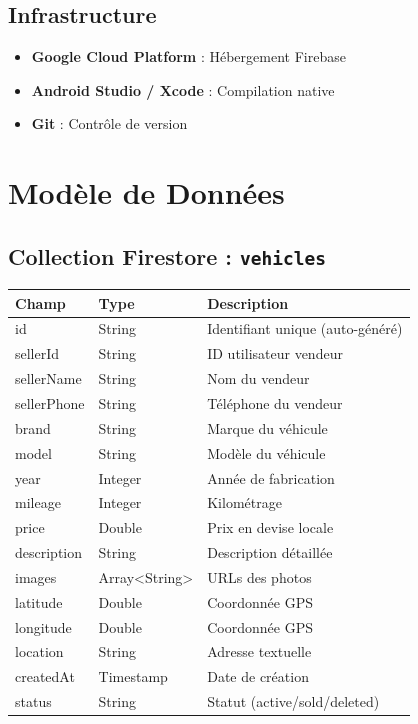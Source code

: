 \documentclass[11pt,a4paper]{article}
\begin{document}
\subsection{Infrastructure}

\begin{itemize}
    \item \textbf{Google Cloud Platform} : Hébergement Firebase
    \item \textbf{Android Studio / Xcode} : Compilation native
    \item \textbf{Git} : Contrôle de version
\end{itemize}

\section{Modèle de Données}

\subsection{Collection Firestore : \texttt{vehicles}}

\begin{small}
\begin{tabular}{|l|l|p{6cm}|}
\hline
\textbf{Champ} & \textbf{Type} & \textbf{Description} \\
\hline
id & String & Identifiant unique (auto-généré) \\
sellerId & String & ID utilisateur vendeur \\
sellerName & String & Nom du vendeur \\
sellerPhone & String & Téléphone du vendeur \\
brand & String & Marque du véhicule \\
model & String & Modèle du véhicule \\
year & Integer & Année de fabrication \\
mileage & Integer & Kilométrage \\
price & Double & Prix en devise locale \\
description & String & Description détaillée \\
images & Array<String> & URLs des photos \\
latitude & Double & Coordonnée GPS \\
longitude & Double & Coordonnée GPS \\
location & String & Adresse textuelle \\
createdAt & Timestamp & Date de création \\
status & String & Statut (active/sold/deleted) \\
\hline
\end{tabular}
\end{small}
\end{document}
